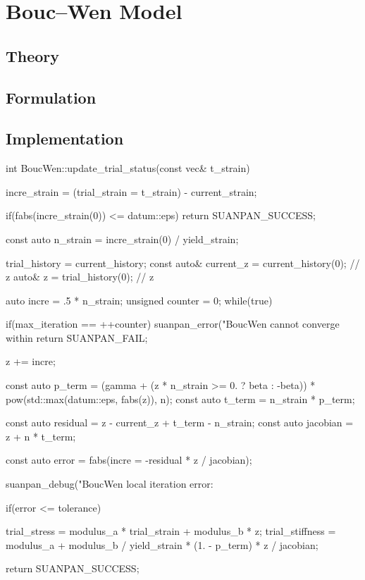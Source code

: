 \section{Bouc--Wen Model}
\subsection{Theory}
\subsection{Formulation}
\subsection{Implementation}
\begin{cppcode}
int BoucWen::update_trial_status(const vec& t_strain) {
    incre_strain = (trial_strain = t_strain) - current_strain;

    if(fabs(incre_strain(0)) <= datum::eps) return SUANPAN_SUCCESS;

    const auto n_strain = incre_strain(0) / yield_strain;

    trial_history = current_history;
    const auto& current_z = current_history(0); // z
    auto& z = trial_history(0);                 // z

    auto incre = .5 * n_strain;
    unsigned counter = 0;
    while(true) {
        if(max_iteration == ++counter) {
            suanpan_error("BoucWen cannot converge within %
            return SUANPAN_FAIL;
        }

        z += incre;

        const auto p_term = (gamma + (z * n_strain >= 0. ? beta : -beta)) * pow(std::max(datum::eps, fabs(z)), n);
        const auto t_term = n_strain * p_term;

        const auto residual = z - current_z + t_term - n_strain;
        const auto jacobian = z + n * t_term;

        const auto error = fabs(incre = -residual * z / jacobian);

        suanpan_debug("BoucWen local iteration error: %

        if(error <= tolerance) {
            trial_stress = modulus_a * trial_strain + modulus_b * z;
            trial_stiffness = modulus_a + modulus_b / yield_strain * (1. - p_term) * z / jacobian;

            return SUANPAN_SUCCESS;
        }
    }
}
\end{cppcode}
